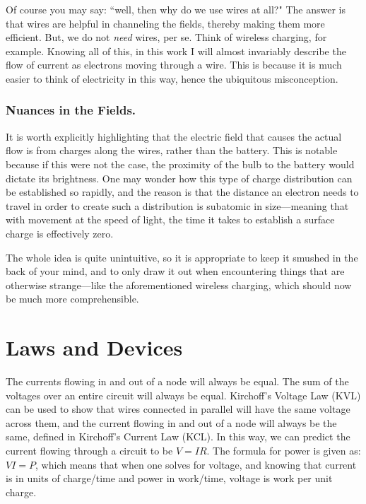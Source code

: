 Of course you may say: ``well, then why do we use wires at all?" The answer is that wires are helpful in channeling the fields, thereby making them more efficient. But, we do not \textit{need} wires, per se. Think of wireless charging, for example. Knowing all of this, in this work I will almost invariably describe the flow of current as electrons moving through a wire. This is because it is much easier to think of electricity in this way, hence the ubiquitous misconception. 

\subsubsection{Nuances in the Fields.} It is worth explicitly highlighting that the electric field that causes the actual flow is from charges along the wires, rather than the battery. This is notable because if this were not the case, the proximity of the bulb to the battery would dictate its brightness. One may wonder how this type of charge distribution can be established so rapidly, and the reason is that the distance an electron needs to travel in order to create such a distribution is subatomic in size---meaning that with movement at the speed of light, the time it takes to establish a surface charge is effectively zero.\newline

The whole idea is quite unintuitive, so it is appropriate to keep it smushed in the back of your mind, and to only draw it out when encountering things that are otherwise strange---like the aforementioned wireless charging, which should now be much more comprehensible. 



\section{Laws and Devices} The currents flowing in and out of a node will always be equal. The sum of the voltages over an entire circuit will always be equal. Kirchoff's Voltage Law (KVL) can be used to show that wires connected in parallel will have the same voltage across them, and the current flowing in and out of a node will always be the same, defined in  Kirchoff's Current Law (KCL). In this way, we can predict the current flowing through a circuit to be $V = IR$. The formula for power is given as: $VI = P$, which means that when one solves for voltage, and knowing that current is in units of charge/time and power in work/time, voltage is work per unit charge.\newline

